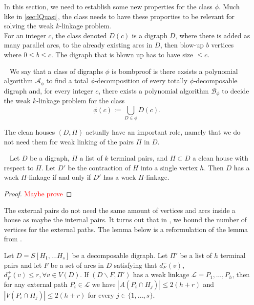 In this section, we need to establish some new properties for the class $\phi$. 
Much like in \autoref{sec:lQuasi}, the class needs to have these proporties to be relevant for solving the weak $k$-linkage problem.\\ 
For an integer $c$, the class denoted $D(c)$ is a digraph $D$, where there is added as many parallel arcs, to the already existing arcs in $D$, then blow-up $b$ vertices where $0\leq b\leq c$. 
The digraph that is blown up has to have size $\leq c$. 

\begin{definition}~\cite{bangJGT85}
    We say that a class of digraphs $\phi$ is bombproof is there exsists a polynomial algorithm $\mathcal{A}_{\phi}$ to find a total $\phi$-decomposition of every totally $\phi$-decomposable digraph and, for every integer $c$, there exists a polynomial algorithm  $\mathcal{B}_{\phi}$ to decide the weak $k$-linkage problem for the class
    \begin{equation}
        \phi(c):=\bigcup_{D\in \phi}D(c). 
    \end{equation}
    \label{def:bombproof}
\end{definition}
The clean houses $(D,\Pi)$ actually have an important role, namely that we do not need them for weak linking of the pairs $\Pi$ in $D$.
\begin{lemma}~\cite{bangJGT85}
    Let $D$ be a digraph, $\Pi$ a list of $k$ terminal pairs, and $H\subset D$ a clean house with respect to $\Pi$. Let $D'$ be the contraction of $H$ into a single vertex $h$. Then $D$ has a waek $\Pi$-linkage if and only if $D'$ has a waek $\Pi$-linkage.  
    \label{lemma:cleanhouse}
\end{lemma}
\begin{proof}
    \textcolor{red}{Maybe prove}
\end{proof}
The external pairs do not need the same amount of vertices and arcs inside a house as maybe the internal pairs. It turns out that in \cite{bangJGT77}, we bound the number of vertices for the external paths. The lemma below is a reformulation of the lemma from \cite{bangJGT77}. 
\begin{lemma}
    Let $D=S[H_1,\dots H_s]$ be a decomposable digraph. 
    Let $\Pi '$ be a list of $h$ terminal pairs and let $F$ be a set of arcs in $D$ satisfying that $d^-_F(v)$, $d^+_F(v)\leq r, \forall v\in V(D)$.
    If $(D\backslash F , \Pi')$ has a weak linkage $\mathcal{L}=P_1,\dots ,P_h$, then for any external path $P_i\in \mathcal{L}$ we have $|A(P_i\cap H_j)|\leq 2(h+r)$ and $|V(P_i\cap H_j)|\leq 2(h+r)$ for every $j\in \lbrace 1,\dots ,s\rbrace$.
    \label{lemma:external}
\end{lemma}

